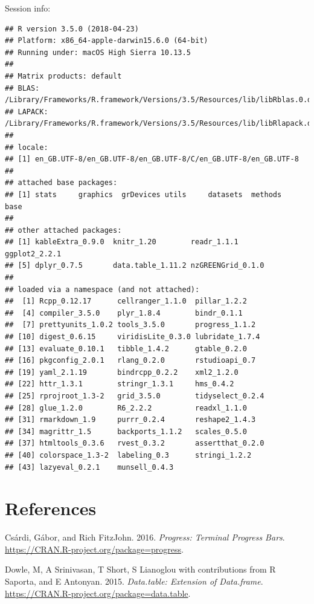 \documentclass[]{article}
\begin{document}
Session info:

\begin{verbatim}
## R version 3.5.0 (2018-04-23)
## Platform: x86_64-apple-darwin15.6.0 (64-bit)
## Running under: macOS High Sierra 10.13.5
## 
## Matrix products: default
## BLAS: /Library/Frameworks/R.framework/Versions/3.5/Resources/lib/libRblas.0.dylib
## LAPACK: /Library/Frameworks/R.framework/Versions/3.5/Resources/lib/libRlapack.dylib
## 
## locale:
## [1] en_GB.UTF-8/en_GB.UTF-8/en_GB.UTF-8/C/en_GB.UTF-8/en_GB.UTF-8
## 
## attached base packages:
## [1] stats     graphics  grDevices utils     datasets  methods   base     
## 
## other attached packages:
## [1] kableExtra_0.9.0  knitr_1.20        readr_1.1.1       ggplot2_2.2.1    
## [5] dplyr_0.7.5       data.table_1.11.2 nzGREENGrid_0.1.0
## 
## loaded via a namespace (and not attached):
##  [1] Rcpp_0.12.17      cellranger_1.1.0  pillar_1.2.2     
##  [4] compiler_3.5.0    plyr_1.8.4        bindr_0.1.1      
##  [7] prettyunits_1.0.2 tools_3.5.0       progress_1.1.2   
## [10] digest_0.6.15     viridisLite_0.3.0 lubridate_1.7.4  
## [13] evaluate_0.10.1   tibble_1.4.2      gtable_0.2.0     
## [16] pkgconfig_2.0.1   rlang_0.2.0       rstudioapi_0.7   
## [19] yaml_2.1.19       bindrcpp_0.2.2    xml2_1.2.0       
## [22] httr_1.3.1        stringr_1.3.1     hms_0.4.2        
## [25] rprojroot_1.3-2   grid_3.5.0        tidyselect_0.2.4 
## [28] glue_1.2.0        R6_2.2.2          readxl_1.1.0     
## [31] rmarkdown_1.9     purrr_0.2.4       reshape2_1.4.3   
## [34] magrittr_1.5      backports_1.1.2   scales_0.5.0     
## [37] htmltools_0.3.6   rvest_0.3.2       assertthat_0.2.0 
## [40] colorspace_1.3-2  labeling_0.3      stringi_1.2.2    
## [43] lazyeval_0.2.1    munsell_0.4.3
\end{verbatim}

\section*{References}\label{references}

\hypertarget{refs}{}
\hypertarget{ref-progress}{}
Csárdi, Gábor, and Rich FitzJohn. 2016. \emph{Progress: Terminal
Progress Bars}. \url{https://CRAN.R-project.org/package=progress}.

\hypertarget{ref-data.table}{}
Dowle, M, A Srinivasan, T Short, S Lianoglou with contributions from R
Saporta, and E Antonyan. 2015. \emph{Data.table: Extension of
Data.frame}. \url{https://CRAN.R-project.org/package=data.table}.
\end{document}
